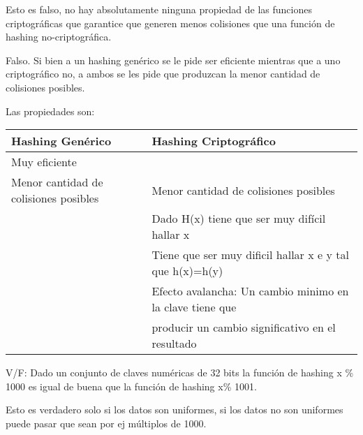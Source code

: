 \documentclass[a4paper]{article}
\newenvironment{enunciado}[3]{%
    \vspace{\baselineskip}
    \tcolorbox[beamer,%
    noparskip,breakable,
    colback=LightGreen,colframe=DarkGreen,%
    colbacklower=LimeGreen!75!LightGreen,%
    title=\small Enunciado: Año #1\, Cuatrimestre #2\, Oportunidad #3]}%
    {\endtcolorbox}
\newenvironment{criterio}[3]{%
    \tcolorbox[beamer,%
    noparskip,breakable,
    colback=LightCoral,colframe=DarkRed,%
    colbacklower=Tomato!75!LightCoral,%
    title=\small Criterio de Corrección: Año #1\, Cuatrimestre #2\, Oportunidad #3]}%
    {\endtcolorbox}
\begin{document}
    \begin{criterio}{2016}{2}{1}
        Esto es falso, no hay absolutamente ninguna propiedad de las funciones criptográficas que garantice que generen menos colisiones que una función de hashing no-criptográfica. 
    \end{criterio}

    Falso. Si bien a un hashing genérico se le pide ser eficiente mientras que a uno criptográfico no, a ambos se les pide que produzcan la menor cantidad de colisiones posibles.

    Las propiedades son:     

    \begin{table}[H]
        \begin{tabular}{l|l}
        Hashing Genérico                      & Hashing Criptográfico                                                                      \\
        \hline
        Muy eficiente                         &                                                                                            \\
        Menor cantidad de colisiones posibles & Menor cantidad de colisiones posibles                                                      \\
                                              & Dado H(x) tiene que ser muy difícil hallar x                                               \\
                                              & Tiene que ser muy dificil hallar x e y tal que h(x)=h(y)                                  \\
                                              & Efecto avalancha: Un cambio minimo en la clave tiene que \\
                                              & \quad producir un cambio significativo en el resultado
        \end{tabular}
    \end{table}

    \begin{enunciado}{2016}{2}{1}
        V/F: Dado   un   conjunto   de   claves numéricas de 32 bits la función de hashing   x   \%   1000   es   igual   de buena que la función de hashing x\% 1001. 
    \end{enunciado}

    \begin{criterio}{2016}{2}{1} 
        Esto es verdadero solo si los datos son uniformes, si los datos no son uniformes puede pasar que sean por ej múltiplos de 1000.    
    \end{criterio}
\end{document}
